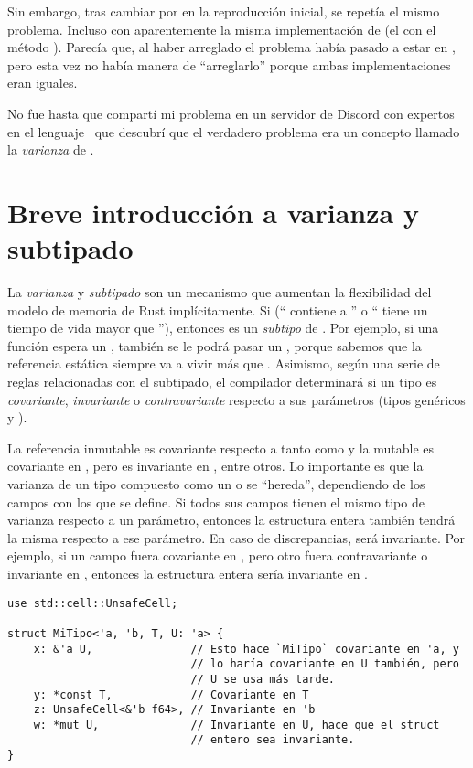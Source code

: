 Sin embargo, tras cambiar  por  en la
reproducción inicial, se repetía el mismo problema. Incluso con aparentemente la
misma implementación de  (el \trait con el método ). Parecía
que, al haber arreglado  el problema había pasado a estar en
, pero esta vez no había manera de ``arreglarlo'' porque ambas
implementaciones eran iguales.

No fue hasta que compartí mi problema en un servidor de Discord con expertos en
el lenguaje~\cite{rustdiscord} que descubrí que el verdadero problema era un
concepto llamado la \emph{varianza} de .

\section{Breve introducción a varianza y subtipado}

La \emph{varianza} y \emph{subtipado} son un mecanismo que aumentan la
flexibilidad del modelo de memoria de Rust implícitamente. Si 
(`` contiene a '' o `` tiene un tiempo de vida mayor
que ''), entonces  es un \emph{subtipo} de . Por
ejemplo, si una función espera un , también se le podrá pasar un
, porque sabemos que la referencia estática 
siempre va a vivir más que . Asimismo, según una serie de reglas
relacionadas con el subtipado, el compilador determinará si un tipo es
\emph{covariante}, \emph{invariante} o \emph{contravariante} respecto a sus
parámetros (tipos genéricos y \lifetimes).

La referencia inmutable  es covariante respecto a tanto 
como  y la mutable  es covariante en , pero es
invariante en , entre otros. Lo importante es que la varianza de un
tipo compuesto como un  o  se ``hereda'', dependiendo de
los campos con los que se define. Si todos sus campos tienen el mismo tipo de
varianza respecto a un parámetro, entonces la estructura entera también tendrá
la misma respecto a ese parámetro. En caso de discrepancias, será invariante.
Por ejemplo, si un campo fuera covariante en , pero otro fuera
contravariante o invariante en , entonces la estructura entera sería
invariante en .

\begin{verbatim}
use std::cell::UnsafeCell;

struct MiTipo<'a, 'b, T, U: 'a> {
    x: &'a U,               // Esto hace `MiTipo` covariante en 'a, y
                            // lo haría covariante en U también, pero
                            // U se usa más tarde.
    y: *const T,            // Covariante en T
    z: UnsafeCell<&'b f64>, // Invariante en 'b
    w: *mut U,              // Invariante en U, hace que el struct
                            // entero sea invariante.
}
\end{verbatim}

